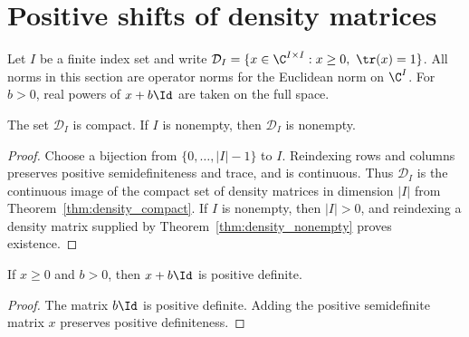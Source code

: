 \section{Positive shifts of density matrices}
\label{sec:shifted_density_powers}

Let $I$ be a finite index set and write
$\mathcal D_I=\{x\in\C^{I\times I}:x\ge0,\ \tr(x)=1\}$.
All norms in this section are operator norms for the Euclidean norm on
$\C^I$. For $b>0$, real powers of $x+b\Id$ are taken on the full space.


\begin{theorem}
    \label{thm:density_finite_index_compact}
    \leanok
    The set $\mathcal D_I$ is compact. If $I$ is nonempty, then
    $\mathcal D_I$ is nonempty.
\end{theorem}

\begin{proof}
    \leanok
    Choose a bijection from $\{0,\ldots,|I|-1\}$ to $I$.
    Reindexing rows and columns preserves positive semidefiniteness and
    trace, and is continuous. Thus $\mathcal D_I$ is the continuous image
    of the compact set of density matrices in dimension $|I|$ from
    Theorem~\ref{thm:density_compact}. If $I$ is nonempty, then $|I|>0$,
    and reindexing a density matrix supplied by
    Theorem~\ref{thm:density_nonempty} proves existence.
\end{proof}

\begin{theorem}
    \label{thm:positive_identity_shift}
    \leanok
    If $x\ge0$ and $b>0$, then $x+b\Id$ is positive definite.
\end{theorem}

\begin{proof}
    \leanok
    The matrix $b\Id$ is positive definite. Adding the positive
    semidefinite matrix $x$ preserves positive definiteness.
\end{proof}

